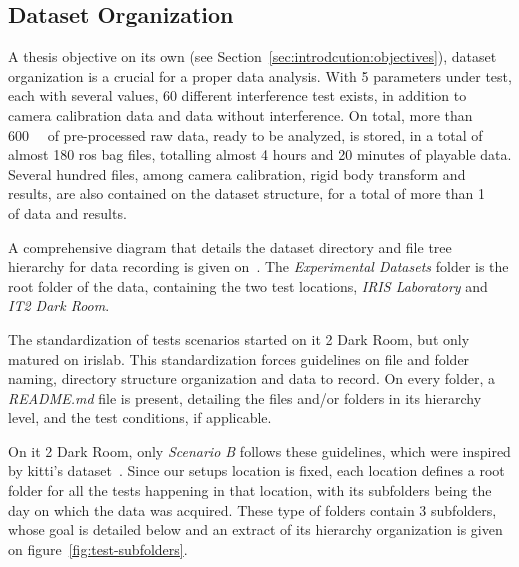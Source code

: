 \subsection{Dataset Organization}
A thesis objective on its own (see Section~\ref{sec:introdcution:objectives}), dataset organization is a crucial for a proper data analysis. With 5 parameters under test, each with several values, 60 different interference test exists, in addition to camera calibration data and data without interference. On total, more than \SI{600}{\giga\byte} of pre-processed raw data, ready to be analyzed, is stored, in a total of almost 180 \ac{ros} bag files, totalling almost 4 hours and 20 minutes of playable data. Several hundred files, among camera calibration, rigid body transform and results, are also contained on the dataset structure, for a total of more than \SI{1}{\tera\byte} of data and results.

A comprehensive diagram that details the dataset directory and file tree hierarchy for data recording is given on~. The \textit{Experimental Datasets} folder is the root folder of the data, containing the two test locations, \textit{IRIS Laboratory} and \textit{IT2 Dark Room}. 

The standardization of tests scenarios started on \ac{it} 2 Dark Room, but only matured on \ac{irislab}. This standardization forces guidelines on file and folder naming, directory structure organization and data to record. On every folder, a \textit{README.md} file is present, detailing the files and/or folders in its hierarchy level, and the test conditions, if applicable. 

On \ac{it} 2 Dark Room, only \textit{Scenario B} follows these guidelines, which were inspired by \ac{kitti}'s dataset~\cite{Geiger2013a}. Since our setups location is fixed, each location defines a root folder for all the tests happening in that location, with its subfolders being the day on which the data was acquired. These type of folders contain  3 subfolders, whose goal is detailed below and an extract of its  hierarchy organization is given on figure~\ref{fig:test-subfolders}.

